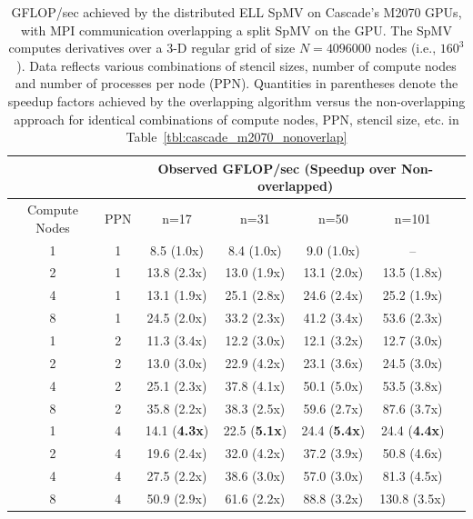 \begin{table}[ht]
\centering
\caption{GFLOP/sec achieved by the distributed ELL SpMV on Cascade's M2070 GPUs, with MPI communication overlapping a split SpMV on the GPU. The SpMV computes derivatives over a 3-D regular grid of size $N=4096000$ nodes (i.e., $160^3$). Data reflects various combinations of stencil sizes, number of compute nodes and number of processes per node (PPN). Quantities in parentheses denote the speedup factors achieved by the overlapping algorithm versus the non-overlapping approach for identical combinations of compute nodes, PPN, stencil size, etc. in Table~\ref{tbl:cascade_m2070_nonoverlap} }
\label{tbl:cascade_m2070_overlap}
\begin{tabular}{c|c|c|c|c|c|c}
 \multicolumn{2}{c}{ } & \multicolumn{4}{|c|}{Observed GFLOP/sec (Speedup over Non-overlapped)} \\  \hline
Compute Nodes   &   PPN  &   n=17   &   n=31   &   n=50   &   n=101   \\ \hline
1   &   1   &   8.5 (1.0x)   &   8.4 (1.0x)   &   9.0 (1.0x)   &  --    \\
2   &   1   &   13.8 (2.3x)   &   13.0 (1.9x)   &   13.1 (2.0x)   &   13.5 (1.8x)   \\
4   &   1   &   13.1 (1.9x)   &   25.1 (2.8x)   &   24.6 (2.4x)   &   25.2 (1.9x)   \\
8   &   1   &   24.5 (2.0x)   &   33.2 (2.3x)   &   41.2 (3.4x)   &   53.6 (2.3x)   \\ \hline
1   &   2   &   11.3 (3.4x)   &   12.2 (3.0x)   &   12.1 (3.2x)   &   12.7 (3.0x)   \\
2   &   2   &   13.0 (3.0x)   &   22.9 (4.2x)   &   23.1 (3.6x)   &   24.5 (3.0x)   \\
4   &   2   &   25.1 (2.3x)   &   37.8 (4.1x)   &   50.1 (5.0x)   &   53.5 (3.8x)   \\
8   &   2   &   35.8 (2.2x)   &   38.3 (2.5x)   &   59.6 (2.7x)   &   87.6 (3.7x)   \\ \hline
1   &   4   &   14.1 (\textbf{4.3x})   &   22.5 (\textbf{5.1x})   &   24.4 (\textbf{5.4x})   &   24.4 (\textbf{4.4x})   \\
2   &   4   &   19.6 (2.4x)   &   32.0 (4.2x)   &   37.2 (3.9x)   &   50.8 (4.6x)   \\
4   &   4   &   27.5 (2.2x)   &   38.6 (3.0x)   &   57.0 (3.0x)   &   81.3 (4.5x)   \\
8   &   4   &   50.9 (2.9x)   &   61.6 (2.2x)   &   88.8 (3.2x)   &   130.8 (3.5x)  
\end{tabular} 
\end{table}

